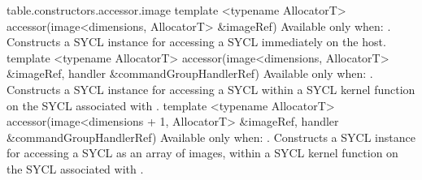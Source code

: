 
{table.constructors.accessor.image}
  \addRowThreeL
    { template <typename AllocatorT> }
    { accessor(image<dimensions, AllocatorT> }
    { \&imageRef) }
    {
      Available only when: .
      \newline
      Constructs a SYCL  instance for accessing a SYCL
       immediately on the host.
    }
  \addRowThreeL
    { template <typename AllocatorT> }
    { accessor(image<dimensions, AllocatorT> }
    { \&imageRef, handler \&commandGroupHandlerRef) }
    {
      Available only when: .
      \newline
      Constructs a SYCL  instance for accessing a SYCL
       within a SYCL kernel function on the SYCL
       associated with .
    }
  \addRowThreeL
    { template <typename AllocatorT> }
    { accessor(image<dimensions + 1, AllocatorT> }
    { \&imageRef, handler \&commandGroupHandlerRef) }
    {
      Available only when: .
      \newline
      Constructs a SYCL  instance for accessing a SYCL
       as an array of images, within a SYCL kernel function on
      the SYCL  associated with .
    }
\completeTable

